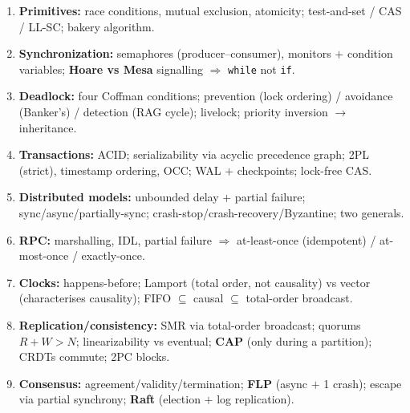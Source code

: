 \documentclass[11pt,a4paper]{article}
\begin{document}
\begin{must}
\begin{enumerate}[leftmargin=*,itemsep=2pt]
  \item \textbf{Primitives:} race conditions, mutual exclusion, atomicity; test-and-set / CAS / LL-SC; bakery algorithm.
  \item \textbf{Synchronization:} semaphores (producer--consumer), monitors $+$ condition variables; \textbf{Hoare vs Mesa} signalling $\Rightarrow$ \texttt{while} not \texttt{if}.
  \item \textbf{Deadlock:} four Coffman conditions; prevention (lock ordering) / avoidance (Banker's) / detection (RAG cycle); livelock; priority inversion $\to$ inheritance.
  \item \textbf{Transactions:} ACID; serializability via acyclic precedence graph; 2PL (strict), timestamp ordering, OCC; WAL $+$ checkpoints; lock-free CAS.
  \item \textbf{Distributed models:} unbounded delay $+$ partial failure; sync/async/partially-sync; crash-stop/crash-recovery/Byzantine; two generals.
  \item \textbf{RPC:} marshalling, IDL, partial failure $\Rightarrow$ at-least-once (idempotent) / at-most-once / exactly-once.
  \item \textbf{Clocks:} happens-before; Lamport (total order, not causality) vs vector (characterises causality); FIFO $\subseteq$ causal $\subseteq$ total-order broadcast.
  \item \textbf{Replication/consistency:} SMR via total-order broadcast; quorums $R+W>N$; linearizability vs eventual; \textbf{CAP} (only during a partition); CRDTs commute; 2PC blocks.
  \item \textbf{Consensus:} agreement/validity/termination; \textbf{FLP} (async $+$ 1 crash); escape via partial synchrony; \textbf{Raft} (election $+$ log replication).
  \end{enumerate}
\end{must}
\end{document}
